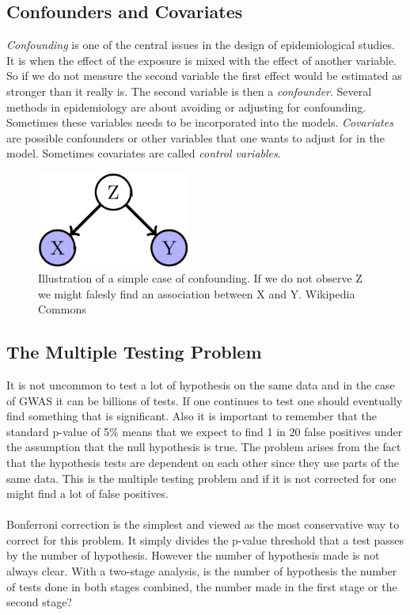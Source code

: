 \documentclass[10pt,a4paper]{report}
\begin{document}
\subsection{Confounders and Covariates}
\emph{Confounding} is one of the central issues in the design of epidemiological studies. It is when the effect of the exposure is mixed with the effect of another variable. So if we do not measure the second variable the first effect would be estimated as stronger than it really is. The second variable is then a \emph{confounder}. Several methods in epidemiology are about avoiding or adjusting for confounding. Sometimes these variables needs to be incorporated into the models. \emph{Covariates} are possible confounders or other variables that one wants to adjust for in the model. Sometimes covariates are called \emph{control variables}.\cite{rothman2002intro_epidemiology,rothman1998modern}

\begin{figure}[h]
    \centering
    \includegraphics[width=5cm]{Simple_Confounding_Case.png}
    \caption{Illustration of a simple case of confounding. If we do not observe Z we might falesly find an association between X and Y. Wikipedia Commons}
    \label{fig:confunding}
\end{figure}

\subsection{The Multiple Testing Problem}
It is not uncommon to test a lot of hypothesis on the same data and in the case of GWAS it can be billions of tests. If one continues to test one should eventually find something that is significant. Also it is important to remember that the standard p-value of 5\% means that we expect to find 1 in 20 false positives under the assumption that the null hypothesis is true. The problem arises from the fact that the hypothesis tests are dependent on each other since they use parts of the same data. This is the multiple testing problem and if it is not corrected for one might find a lot of false positives.\cite{bonferroni_multiple}\\
\\
Bonferroni correction is the simplest and viewed as the most conservative way to correct for this problem. It simply divides the p-value threshold that a test passes by the number of hypothesis. However the number of hypothesis made is not always clear. With a two-stage analysis, is the number of hypothesis the number of tests done in both stages combined, the number made in the first stage or the second stage?\cite{bonferroni_multiple}
\end{document}
